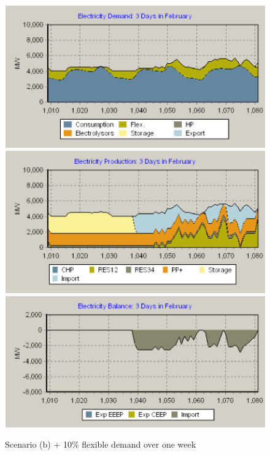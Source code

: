 \begin{appendices}
  \begin{figure}[htbp]
    \centering
    \includegraphics[scale=1.4]{figures/B16-3day-demand.png}
    \includegraphics[scale=1.4]{figures/B16-3day-production.png}
    \includegraphics[scale=1.4]{figures/B16-3day-balance.png}
    \caption{Scenario (b) + 10\% flexible demand over one week}
    \label{app:B16}
  \end{figure}


\end{appendices}
